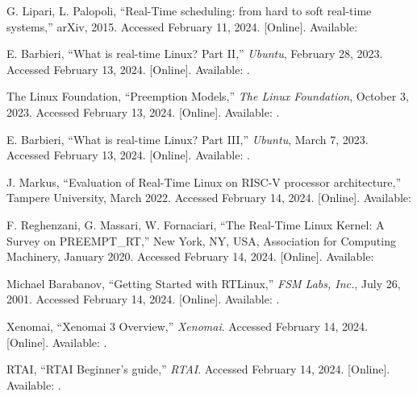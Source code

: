 \begin{thebibliography}{99}
        G. Lipari, L. Palopoli,
        ``Real-Time scheduling: from hard to soft real-time systems,''
        arXiv, 2015.
        Accessed February 11, 2024.
        [Online].
        Available: 

        E. Barbieri,
        ``What is real-time Linux? Part II,''
        \textit{Ubuntu}, February 28, 2023.
        Accessed February 13, 2024.
        [Online].
        Available: .

        The Linux Foundation,
        ``Preemption Models,''
        \textit{The Linux Foundation}, October 3, 2023.
        Accessed February 13, 2024.
        [Online].
        Available: .

        E. Barbieri,
        ``What is real-time Linux? Part III,''
        \textit{Ubuntu}, March 7, 2023.
        Accessed February 13, 2024.
        [Online].
        Available: .

        J. Markus,
        ``Evaluation of Real-Time Linux on RISC-V processor architecture,''
        Tampere University, March 2022.
        Accessed February 14, 2024.
        [Online].
        Available: 

        F. Reghenzani, G. Massari, W. Fornaciari,
        ``The Real-Time Linux Kernel: A Survey on PREEMPT\_RT,''
        New York, NY, USA, Association for Computing Machinery, January 2020.
        Accessed February 14, 2024.
        [Online].
        Available: 

        Michael Barabanov,
        ``Getting Started with RTLinux,''
        \textit{FSM Labs, Inc.}, July 26, 2001.
        Accessed February 14, 2024.
        [Online].
        Available: .

        Xenomai,
        ``Xenomai 3 Overview,''
        \textit{Xenomai}.
        Accessed February 14, 2024.
        [Online].
        Available: .

        RTAI,
        ``RTAI Beginner's guide,''
        \textit{RTAI}.
        Accessed February 14, 2024.
        [Online].
        Available: .

\end{thebibliography}

